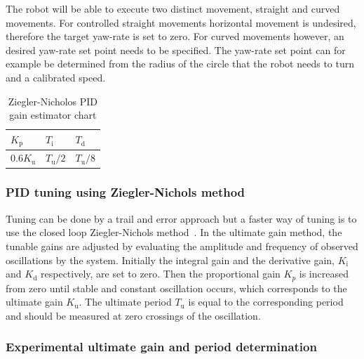 The robot will be able to execute two distinct movement, straight and curved movements.
For controlled straight movements horizontal movement is undesired, therefore the target yaw-rate is set to zero.
For curved movements however, an desired yaw-rate set point needs to be specified.
The yaw-rate set point can for example be determined from the radius of the circle that the robot needs to turn and a calibrated speed.

\begin{table}[t]
	\centering
	\caption{Ziegler-Nicholos PID gain estimator chart}
	\label{tab:gain_chart}
	\begin{tabular}{|l|l|l|} 
		\hline
		$K_{\text{p}}$ & $T_{\text{i}}$ & $T_{\text{d}}$ \\
		\hline \hline
		0.6$K_{\text{u}}$ & $T_{\text{u}}/2$ & $T_{\text{u}}/8$ \\
		\hline
	\end{tabular}
\end{table}

\subsubsection{PID tuning using Ziegler-Nichols method}

Tuning can be done by a trail and error approach but a faster way of tuning is to use the closed loop Ziegler-Nichols method~\cite{franklin_feedback_2015}.
In the ultimate gain method, the tunable gains are adjusted by evaluating the amplitude and frequency of observed oscillations by the system.
Initially the integral gain and the derivative gain, $K_{\text{i}}$ and $K_{\text{d}}$ respectively, are set to zero.
Then the proportional gain $K_{p}$ is increased from zero until stable and constant oscillation occurs, which corresponds to the ultimate gain $K_{\text{u}}$.
The ultimate period $T_{\text{u}}$ is equal to the corresponding period and should be measured at zero crossings of the oscillation.

\subsubsection{Experimental ultimate gain and period determination}


